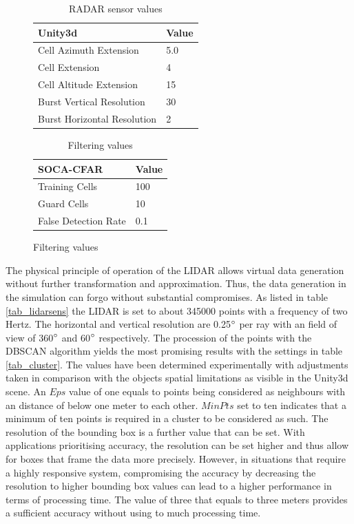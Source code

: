   \begin{figure}[!htb]
 	\begin{minipage}[t]{0.48\textwidth}	
 		\begin{table}[H]	
 			\centering
 			\caption{\ac{RADAR} sensor values}
 			\begin{tabular}{l l } 
 				\midrule\midrule
 				Unity3d  & Value\\ 
 				\midrule
 				Cell Azimuth Extension  &5.0\\
 				Cell Extension & 4  \\
 				Cell Altitude Extension & 15\\
 				Burst Vertical Resolution & 30\\
 				Burst Horizontal Resolution & 2
 			\end{tabular}
 			\label{tab_radarsens}
 		\end{table}
 	\end{minipage}\hfill
 	\begin{minipage}[t]{0.48\textwidth}
 		\begin{table}[H]
 			\centering
 			\caption{Filtering values}
 			\begin{tabular}{l l } 
 				\midrule\midrule 
 				SOCA-CFAR  & Value\\ 
 				\midrule
 				Training Cells&100 \\	
 				Guard Cells&10 \\
 				False Detection Rate& 0.1
 			\end{tabular}
 			\label{tab_filter}
 		\end{table}
 	\end{minipage}
 \end{figure}
 The physical principle of operation of the \ac{LIDAR} allows virtual data generation without further transformation and approximation. Thus, the data generation in the simulation can forgo without substantial compromises. As listed in table \ref{tab_lidarsens} the \ac{LIDAR} is set to about 345000 points with a frequency of two Hertz. The horizontal and vertical resolution are 0.25$\degree$ per ray with an field of view of 360$\degree$ and 60$\degree$ respectively. The procession of the points with the \ac{DBSCAN} algorithm yields the most promising results with the settings in table \ref{tab_cluster}. The values have been determined experimentally with adjustments taken in comparison with the objects spatial limitations as visible in the Unity3d scene. An $Eps$ value of one equals to points being considered as neighbours with an distance of below one meter to each other. $MinPts$ set to ten indicates that a minimum of ten points is required in a cluster to be considered as such. The resolution of the bounding box is a further value that can be set. With applications prioritising accuracy, the resolution can be set higher and thus allow for boxes that frame the data more precisely. However, in situations that require a highly responsive system, compromising the accuracy by decreasing the resolution to higher bounding box values can lead to a higher performance in terms of processing time. The value of three that equals to three meters provides a sufficient accuracy without using to much processing time.
